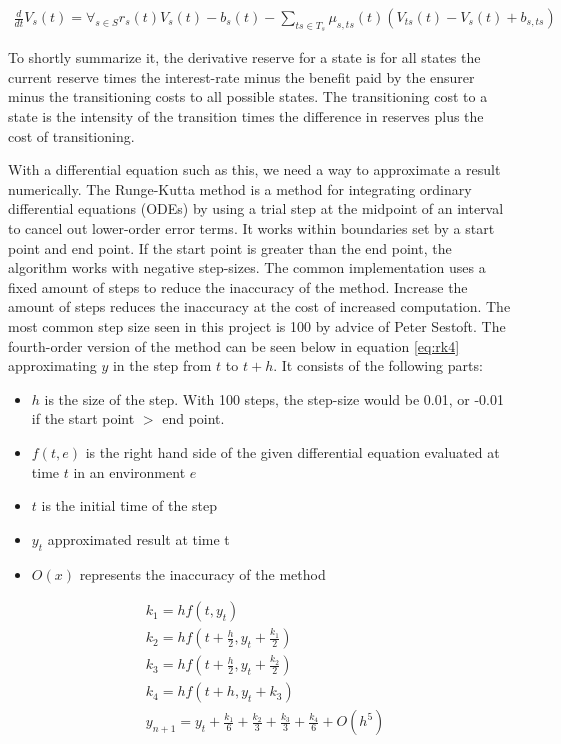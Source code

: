 \begin{equation}\label{eq:thiele}
\begin{split}
\frac{d}{dt}V_s(t) = \forall_{s\in S}r_s(t) V_s(t) - b_s(t) - \sum_{ts \in T_{s}} \mu_{s,ts}(t) (V_{ts}(t) - V_s(t) + b_{s,ts})
\end{split}
\end{equation}

To shortly summarize it, the derivative reserve for a state is for all states the current reserve times the interest-rate minus the benefit paid by the ensurer minus the transitioning costs to all possible states. 
The transitioning cost to a state is the intensity of the transition times the difference in reserves plus the cost of transitioning.

With a differential equation such as this, we need a way to approximate a result numerically. 
The Runge-Kutta method\cite{press2007numerical} is a method for integrating ordinary differential equations (ODEs) by using a trial step at the midpoint of an interval to cancel out lower-order error terms.
It works within boundaries set by a start point and end point. If the start point is greater than the end point, the algorithm works with negative step-sizes.
The common implementation uses a fixed amount of steps to reduce the inaccuracy of the method. 
Increase the amount of steps reduces the inaccuracy at the cost of increased computation.
The most common step size seen in this project is 100 by advice of Peter Sestoft.
The fourth-order version of the method can be seen below in equation \ref{eq:rk4} approximating $y$ in the step from $t$ to $t+h$. It consists of the following parts:

\begin{itemize}
\item $h$ is the size of the step. With 100 steps, the step-size would be 0.01, or -0.01 if the start point $>$ end point.
\item $f(t, e)$  is the right hand side of the given differential equation evaluated at time $t$ in an environment $e$
\item $t$ is the initial time of the step
\item $y_t$ approximated result at time t
\item $O(x)$ represents the inaccuracy of the method
\end{itemize}

\begin{equation}\begin{aligned}\label{eq:rk4}
&k_1 = h f(t, y_t)\\
&k_2 = h f(t + \frac{h}{2}, y_t + \frac{k_1}{2})\\
&k_3 = h f(t + \frac{h}{2}, y_t + \frac{k_2}{2})\\
&k_4 = h f(t + h, y_t + k_3)\\
&y_{n+1} = y_t + \frac{k_1}{6} + \frac{k_2}{3} + \frac{k_3}{3} + \frac{k_4}{6} + O(h^5)
\end{aligned}\end{equation}

